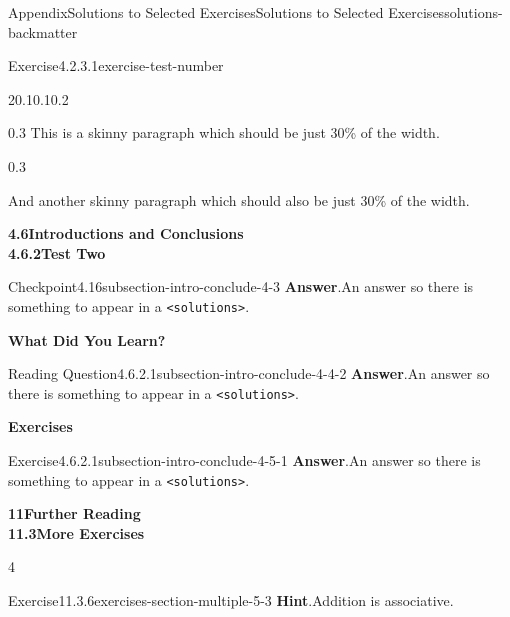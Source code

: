 \documentclass[twoside,10pt,]{article}
\newcommand{\blocktitlefont}{\relax}
\newcommand{\mono}[1]{\texttt{#1}}
\numberwithin{equation}{section}
\begin{document}
\begin{solutions-section}{Appendix}{Solutions to Selected Exercises}{}{Solutions to Selected Exercises}{}{}{solutions-backmatter}
\begin{divisionsolution}{Exercise}{4.2.3.1}{}{exercise-test-number}
\begin{sidebyside}{2}{0.1}{0.1}{0.2}%
\begin{sbspanel}{0.3}%
This is a skinny paragraph which should be just 30\% of the width.%
\end{sbspanel}%
\begin{sbspanel}{0.3}%
\par
And another skinny paragraph which should also be just 30\% of the width.%
\end{sbspanel}%
\end{sidebyside}%
\end{divisionsolution}%
\par\medskip
\noindent\textbf{\large{}4.6\space\textperiodcentered\space{}Introductions and Conclusions\\
4.6.2\space\textperiodcentered\space{}Test Two}
\begin{inlinesolution}{Checkpoint}{4.16}{}{subsection-intro-conclude-4-3}%
\noindent\textbf{\blocktitlefont Answer}.\hypertarget{subsection-intro-conclude-4-3-2-back}{}\quad{}An answer so there is something to appear in a \mono{<solutions>}.%
\end{inlinesolution}%
\par\medskip
\noindent\textbf{\normalsize{}\textperiodcentered\space{}What Did You Learn?}
\begin{divisionsolution}{Reading Question}{4.6.2.1}{}{subsection-intro-conclude-4-4-2}%
\noindent\textbf{\blocktitlefont Answer}.\hypertarget{subsection-intro-conclude-4-4-2-2-back}{}\quad{}An answer so there is something to appear in a \mono{<solutions>}.%
\end{divisionsolution}%
\par\medskip
\noindent\textbf{\normalsize{}\textperiodcentered\space{}Exercises}
\begin{divisionsolution}{Exercise}{4.6.2.1}{}{subsection-intro-conclude-4-5-1}%
\noindent\textbf{\blocktitlefont Answer}.\hypertarget{subsection-intro-conclude-4-5-1-2-back}{}\quad{}An answer so there is something to appear in a \mono{<solutions>}.%
\end{divisionsolution}%
\par\medskip
\noindent\textbf{\large{}11\space\textperiodcentered\space{}Further Reading\\
11.3\space\textperiodcentered\space{}More Exercises}
\begin{exercisegroupcol}{4}
\begin{divisionsolutionegcol}{Exercise}{11.3.6}{}{exercises-section-multiple-5-3}%
\noindent\textbf{\blocktitlefont Hint}.\hypertarget{exercises-section-multiple-5-3-2-back}{}\quad{}Addition is associative.%

\end{divisionsolutionegcol}
\end{exercisegroupcol}
\end{solutions-section}
\end{document}
